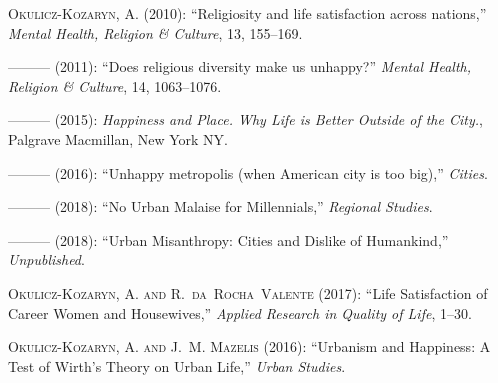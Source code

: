 \documentclass[10pt, letterpaper]{article}
\begin{document}
\begin{spacing}{2.0}
\begin{thebibliography}{115}
\textsc{Okulicz-Kozaryn, A.} (2010): \enquote{Religiosity and life satisfaction
  across nations,} \emph{Mental Health, Religion \& Culture}, 13, 155--169.

---\hspace{-.1pt}---\hspace{-.1pt}--- (2011): \enquote{Does religious diversity
  make us unhappy?} \emph{Mental Health, Religion \& Culture}, 14, 1063--1076.

---\hspace{-.1pt}---\hspace{-.1pt}--- (2015): \emph{Happiness and Place. Why
  Life is Better Outside of the City.}, Palgrave Macmillan, New York NY.

---\hspace{-.1pt}---\hspace{-.1pt}--- (2016): \enquote{Unhappy metropolis (when
  American city is too big),} \emph{Cities}.

---\hspace{-.1pt}---\hspace{-.1pt}--- (2018{}): \enquote{No Urban
  Malaise for Millennials,} \emph{Regional Studies}.

---\hspace{-.1pt}---\hspace{-.1pt}--- (2018{}): \enquote{Urban
  Misanthropy: Cities and Dislike of Humankind,} \emph{Unpublished}.

\textsc{Okulicz-Kozaryn, A. and R.~da~Rocha~Valente} (2017): \enquote{Life
  Satisfaction of Career Women and Housewives,} \emph{Applied Research in
  Quality of Life}, 1--30.

\textsc{Okulicz-Kozaryn, A. and J.~M. Mazelis} (2016): \enquote{Urbanism and
  Happiness: A Test of Wirth's Theory on Urban Life,} \emph{Urban Studies}.


\end{thebibliography}
\end{spacing}
\end{document}
